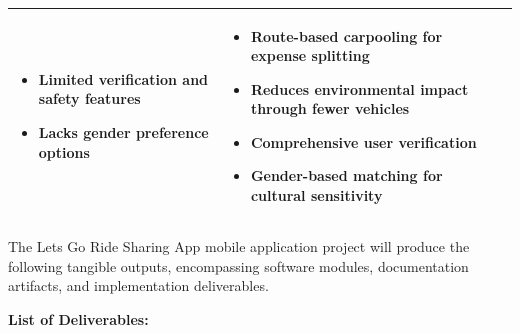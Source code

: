 \begin{table}[htbp]
\begin{tabularx}{\textwidth}{|p{3cm}|X|X|}
\begin{itemize}[leftmargin=*, noitemsep, topsep=0pt]
    \item Limited verification and safety features
    \item Lacks gender preference options
\end{itemize}
&
\begin{itemize}[leftmargin=*, noitemsep, topsep=0pt]
    \item Route-based carpooling for expense splitting
    \item Reduces environmental impact through fewer vehicles
    \item Comprehensive user verification
    \item Gender-based matching for cultural sensitivity
\end{itemize}
\\
\hline
\end{tabularx}
\end{table}


The Lets Go Ride Sharing App mobile application project will produce the following tangible outputs, encompassing software modules, documentation artifacts, and implementation deliverables.

\textbf{List of Deliverables:}


